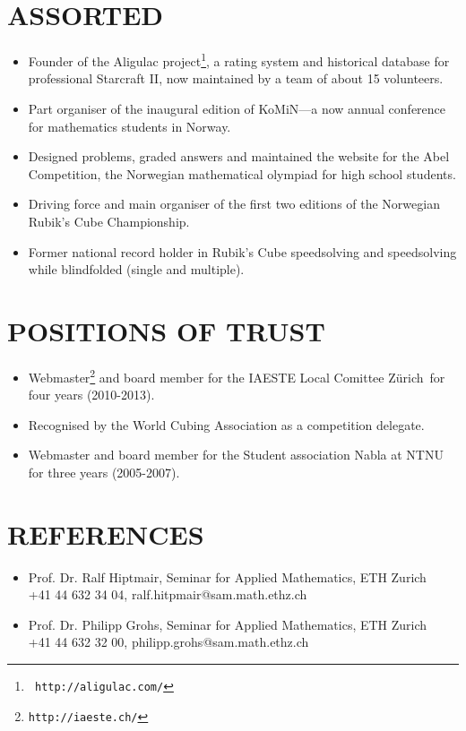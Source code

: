 \documentclass[line,margin]{res}
\newcommand{\zh}{Z\"{u}rich}
\begin{document}
\begin{resume}
\section{ASSORTED}
    \begin{itemize}
        \item Founder of the Aligulac project\footnote{{\tt
            http://aligulac.com/}}, a rating system and historical database for
            professional Starcraft II, now maintained by a team of about 15
            volunteers.
        \item Part organiser of the inaugural edition of KoMiN---a now annual
            conference for mathematics students in Norway.
        \item Designed problems, graded answers and maintained the website for
            the Abel Competition, the Norwegian mathematical olympiad for high
            school students.
        \item Driving force and main organiser of the first two editions of the
            Norwegian Rubik's Cube Championship.
        \item Former national record holder in Rubik's Cube speedsolving and
            speedsolving while blindfolded (single and multiple).
    \end{itemize}


\section{POSITIONS OF TRUST}
    \begin{itemize}
        \item Webmaster\footnote{{\tt http://iaeste.ch/}} and board member for
            the IAESTE Local Comittee \zh\ for four years (2010-2013).
        \item Recognised by the World Cubing Association as a competition
            delegate.
        \item Webmaster and board member for the Student association Nabla at
            NTNU for three years (2005-2007).
    \end{itemize}


\section{REFERENCES}
    \begin{itemize}
        \item Prof. Dr. Ralf Hiptmair, Seminar for Applied Mathematics, ETH Zurich \\
            +41 44 632 34 04, ralf.hitpmair@sam.math.ethz.ch
        \item Prof. Dr. Philipp Grohs, Seminar for Applied Mathematics, ETH Zurich \\
            +41 44 632 32 00, philipp.grohs@sam.math.ethz.ch
    \end{itemize}



\end{resume}
\end{document}
